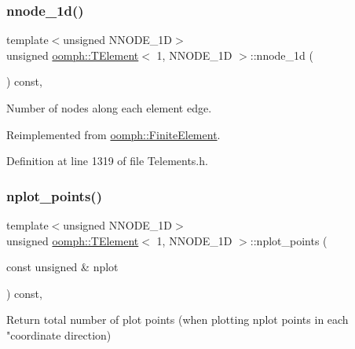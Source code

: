 \subsubsection{\texorpdfstring{nnode\+\_\+1d()}{nnode\_1d()}}
{\footnotesize\ttfamily template$<$unsigned N\+N\+O\+D\+E\+\_\+1D$>$ \\
unsigned \hyperlink{classoomph_1_1TElement}{oomph\+::\+T\+Element}$<$ 1, N\+N\+O\+D\+E\+\_\+1D $>$\+::nnode\+\_\+1d (\begin{DoxyParamCaption}{ }\end{DoxyParamCaption}) const\hspace{0.3cm}{\ttfamily [inline]}, {\ttfamily [virtual]}}



Number of nodes along each element edge. 



Reimplemented from \hyperlink{classoomph_1_1FiniteElement_ab65c7a94dda80c1876a09ac12be4e39c}{oomph\+::\+Finite\+Element}.



Definition at line 1319 of file Telements.\+h.

\mbox{\label{classoomph_1_1TElement_3_011_00_01NNODE__1D_01_4_a3a5ba5b2fd7ab5fffdddf10b07b00ed7}} 
\subsubsection{\texorpdfstring{nplot\+\_\+points()}{nplot\_points()}}
{\footnotesize\ttfamily template$<$unsigned N\+N\+O\+D\+E\+\_\+1D$>$ \\
unsigned \hyperlink{classoomph_1_1TElement}{oomph\+::\+T\+Element}$<$ 1, N\+N\+O\+D\+E\+\_\+1D $>$\+::nplot\+\_\+points (\begin{DoxyParamCaption}\item[{const unsigned \&}]{nplot }\end{DoxyParamCaption}) const\hspace{0.3cm}{\ttfamily [inline]}, {\ttfamily [virtual]}}

Return total number of plot points (when plotting nplot points in each "coordinate direction) 

